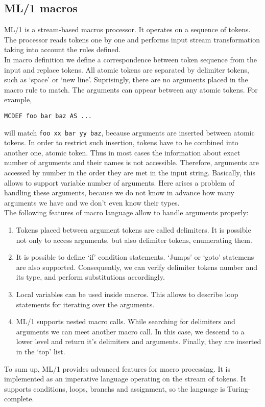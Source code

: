 \subsection{ML/1 macros}
ML/1 is a stream-based macros processor\cite{mli}. It operates on a sequence of
tokens.  The processor reads tokens one by one and performs input stream
transformation taking into account the rules defined. \\ 
In macro definition we define a correspondence between token sequence from the
input and replace tokens. All atomic tokens are separated by delimiter tokens,
such as `space' or `new line'. Suprisingly, there are no arguments placed in
the macro rule to match. The arguments can appear between any atomic tokens.
For example, 
\begin{verbatim}
MCDEF foo bar baz AS ...
\end{verbatim}
will match \verb|foo xx bar yy baz|, because arguments are inserted between
atomic tokens. In order to restrict such insertion, tokens have to be combined
into another one, atomic token. Thus in most cases the information about exact
number of arguments and their names is not accessible. Therefore, arguments are
accessed by number in the order they are met in the input string. Basically,
this allows to support variable number of arguments. Here arises a problem of
handling these arguments, because we do not know in advance how many arguments
we have and we don't even know their types.  \\
The following features of macro language allow to handle arguments properly:
\begin{enumerate}
    \item Tokens placed between argument tokens are called delimiters. It is
    possible not only to access arguments, but also delimiter tokens,
    enumerating them.
    \item It is possible to define `if' condition statements. `Jumps' or `goto'
    statemens are also supported. Consequently, we can verify delimiter tokens
    number and its type, and perform substitutions accordingly.
    \item Local variables can be used inside macros. This allows to describe
    loop statements for iterating over the arguments.
    \item ML/1 supports nested macro calls. While searching for delimiters and
    arguments we can meet another macro call. In this case, we descend to a
    lower level and return it's delimiters and arguments. Finally, they are
    inserted in the `top' list.
\end{enumerate}
To sum up, ML/1 provides advanced features for macro processing. It is
implemented as an imperative language operating on the stream of tokens.  It
supports conditions, loops, branchs and assignment, so the language is
Turing-complete.
